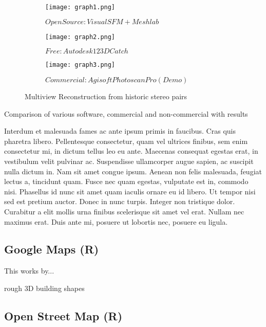 \begin{figure}[h]
	\centering
	\begin{subfigure}[b]{0.3\textwidth}
		\centering
		\texttt{[image: graph1.png]}
		\caption{$OpenSource: Visual SFM + Meshlab$}
		\label{fig:visualsfm meshlab}
	\end{subfigure}
	\hfill
	\begin{subfigure}[b]{0.3\textwidth}
		\centering
		\texttt{[image: graph2.png]}
		\caption{$Free: Autodesk 123D Catch$}
		\label{fig:123dcatch}
	\end{subfigure}
	\hfill
	\begin{subfigure}[b]{0.3\textwidth}
		\centering
		\texttt{[image: graph3.png]}
		\caption{$Commercial: Agisoft Photoscan Pro (Demo)$}
		\label{fig:photoscan pro}
	\end{subfigure}
	\caption{Multiview Reconstruction from historic stereo pairs}
	\label{fig:multiview reconstruction historic stereo}
\end{figure}

Comparison of various software, commercial and non-commercial with results

Interdum et malesuada fames ac ante ipsum primis in faucibus. Cras quis pharetra libero. Pellentesque consectetur, quam vel ultrices finibus, sem enim consectetur mi, in dictum tellus leo eu ante. Maecenas consequat egestas erat, in vestibulum velit pulvinar ac. Suspendisse ullamcorper augue sapien, ac suscipit nulla dictum in. Nam sit amet congue ipsum. Aenean non felis malesuada, feugiat lectus a, tincidunt quam. Fusce nec quam egestas, vulputate est in, commodo nisi. Phasellus id nunc sit amet quam iaculis ornare eu id libero. Ut tempor nisi sed est pretium auctor. Donec in nunc turpis. Integer non tristique dolor. Curabitur a elit mollis urna finibus scelerisque sit amet vel erat. Nullam nec maximus erat. Duis ante mi, posuere ut lobortis nec, posuere eu ligula.

\subsection{Google Maps (R) }

This works by...

rough 3D building shapes

\subsection{Open Street Map (R) }

